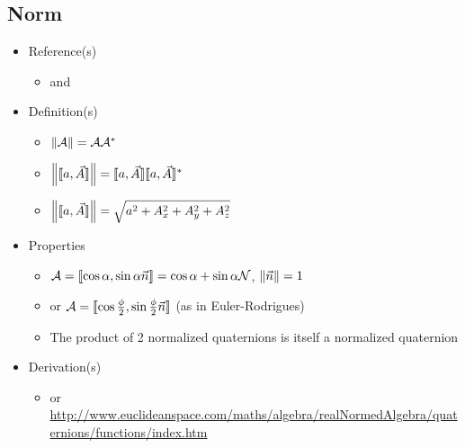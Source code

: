 \documentclass[letterpaper]{article}
\begin{document}
	\subsection{Norm}
	\begin{itemize}
		\item Reference(s)
			\begin{itemize}
				\item \cite{Altmann1986} and \cite{Baker2008}
			\end{itemize}
		\item Definition(s)
			\begin{itemize}
				\item $\left\|\mathcal{A}\right\| = \mathcal{A}\mathcal{A}^\ast$
				\item $\left\|\llbracket a, \vec{A} \rrbracket\right\| = \llbracket a, \vec{A} \rrbracket\llbracket a, \vec{A} \rrbracket^\ast$
				\item $\left\|\llbracket a, \vec{A} \rrbracket\right\| = \sqrt{a^2 + A_x^2 + A_y^2 + A_z^2}$
			\end{itemize}
		\item Properties
			\begin{itemize}
				\item $\mathcal{A} = \llbracket \cos\alpha, \sin\alpha\vec{n} \rrbracket = \cos\alpha + \sin\alpha\mathcal{N}$, $\left\|\vec{n}\right\| = 1$
				\item or $\mathcal{A} = \llbracket \cos\frac{\phi}{2}, \sin\frac{\phi}{2}\vec{n} \rrbracket$ (as in Euler-Rodrigues)
				\item The product of 2 normalized quaternions is itself a normalized quaternion
			\end{itemize}
		\item Derivation(s)
			\begin{itemize}
				\item \cite{Altmann1986} or \url{http://www.euclideanspace.com/maths/algebra/realNormedAlgebra/quaternions/functions/index.htm}
			\end{itemize}
	\end{itemize}
	
\end{document}
